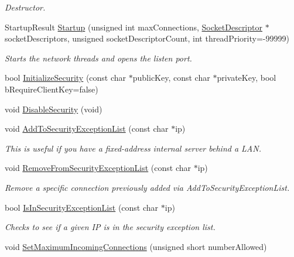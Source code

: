 \begin{DoxyCompactItemize}
\begin{DoxyCompactList}\small\item\em Destructor. \end{DoxyCompactList}\item 
Startup\-Result \hyperlink{class_rak_net_1_1_rak_peer_a92d493cb617381a6e750f7df6e768927}{Startup} (unsigned int max\-Connections, \hyperlink{struct_rak_net_1_1_socket_descriptor}{Socket\-Descriptor} $\ast$socket\-Descriptors, unsigned socket\-Descriptor\-Count, int thread\-Priority=-\/99999)
\begin{DoxyCompactList}\small\item\em Starts the network threads and opens the listen port. \end{DoxyCompactList}\item 
bool \hyperlink{class_rak_net_1_1_rak_peer_a5445d0e8db3e7ef1e38b7fc5bc0d3920}{Initialize\-Security} (const char $\ast$public\-Key, const char $\ast$private\-Key, bool b\-Require\-Client\-Key=false)
\item 
void \hyperlink{class_rak_net_1_1_rak_peer_a489dd712e953836042df5711c8eb7e76}{Disable\-Security} (void)
\item 
void \hyperlink{class_rak_net_1_1_rak_peer_ab927e4b0e70fcc0e06d1ba6a70315eb3}{Add\-To\-Security\-Exception\-List} (const char $\ast$ip)
\begin{DoxyCompactList}\small\item\em This is useful if you have a fixed-\/address internal server behind a L\-A\-N. \end{DoxyCompactList}\item 
void \hyperlink{class_rak_net_1_1_rak_peer_a931823b7400d31ad641d6f6da1e69b88}{Remove\-From\-Security\-Exception\-List} (const char $\ast$ip)
\begin{DoxyCompactList}\small\item\em Remove a specific connection previously added via Add\-To\-Security\-Exception\-List. \end{DoxyCompactList}\item 
bool \hyperlink{class_rak_net_1_1_rak_peer_a654c29f6f195b0dcd105a856c99222d1}{Is\-In\-Security\-Exception\-List} (const char $\ast$ip)
\begin{DoxyCompactList}\small\item\em Checks to see if a given I\-P is in the security exception list. \end{DoxyCompactList}\item 
void \hyperlink{class_rak_net_1_1_rak_peer_a8ed81856dd81ec1cd00e17fafedee0a7}{Set\-Maximum\-Incoming\-Connections} (unsigned short number\-Allowed)

\end{DoxyCompactItemize}
